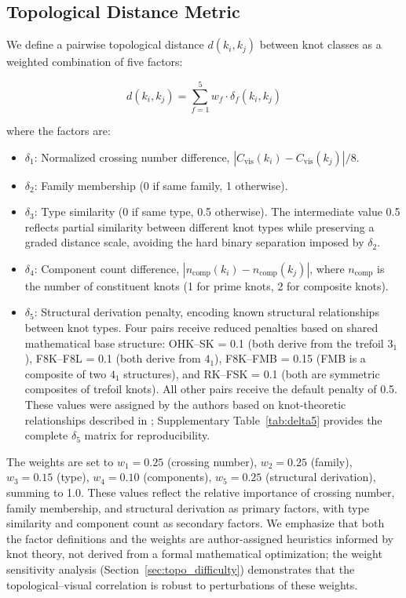 \documentclass[preprint,review,12pt]{elsarticle}
\begin{document}
\subsection{Topological Distance Metric}
\label{sec:topo_metric}

We define a pairwise topological distance $d(k_i, k_j)$ between knot classes as a weighted combination of five factors:

\begin{equation}
d(k_i, k_j) = \sum_{f=1}^{5} w_f \cdot \delta_f(k_i, k_j)
\end{equation}

\noindent where the factors are:
\begin{itemize}
    \item $\delta_1$: Normalized crossing number difference, $|C_{\text{vis}}(k_i) - C_{\text{vis}}(k_j)| / 8$.
    \item $\delta_2$: Family membership (0 if same family, 1 otherwise).
    \item $\delta_3$: Type similarity (0 if same type, 0.5 otherwise). The intermediate value 0.5 reflects partial similarity between different knot types while preserving a graded distance scale, avoiding the hard binary separation imposed by $\delta_2$.
    \item $\delta_4$: Component count difference, $|n_{\text{comp}}(k_i) - n_{\text{comp}}(k_j)|$, where $n_{\text{comp}}$ is the number of constituent knots (1 for prime knots, 2 for composite knots).
    \item $\delta_5$: Structural derivation penalty, encoding known structural relationships between knot types. Four pairs receive reduced penalties based on shared mathematical base structure: OHK--SK = 0.1 (both derive from the trefoil $3_1$), F8K--F8L = 0.1 (both derive from $4_1$), F8K--FMB = 0.15 (FMB is a composite of two $4_1$ structures), and RK--FSK = 0.1 (both are symmetric composites of trefoil knots). All other pairs receive the default penalty of 0.5. These values were assigned by the authors based on knot-theoretic relationships described in \cite{adams2004}; Supplementary Table~\ref{tab:delta5} provides the complete $\delta_5$ matrix for reproducibility.
\end{itemize}
\noindent The weights are set to $w_1 = 0.25$ (crossing number), $w_2 = 0.25$ (family), $w_3 = 0.15$ (type), $w_4 = 0.10$ (components), $w_5 = 0.25$ (structural derivation), summing to 1.0. These values reflect the relative importance of crossing number, family membership, and structural derivation as primary factors, with type similarity and component count as secondary factors. We emphasize that both the factor definitions and the weights are author-assigned heuristics informed by knot theory, not derived from a formal mathematical optimization; the weight sensitivity analysis (Section~\ref{sec:topo_difficulty}) demonstrates that the topological--visual correlation is robust to perturbations of these weights.
\end{document}
